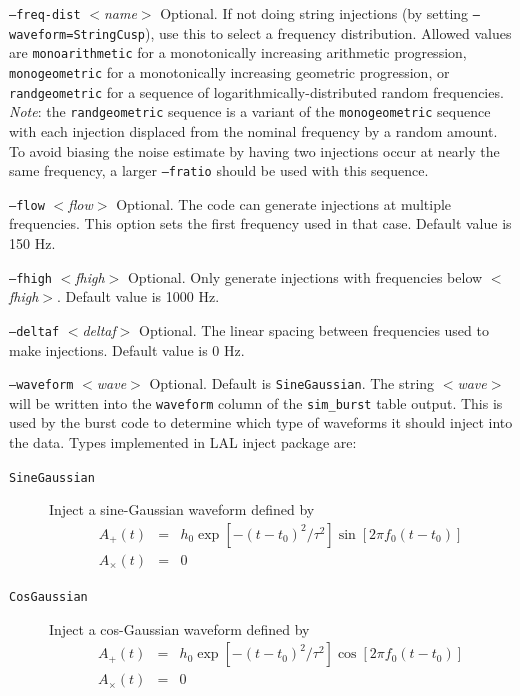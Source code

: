 \documentclass{article}
\newcommand{\option}[1]{\texttt{#1}}
\newcommand{\parm}[1]{$<$\textit{#1}$>$}
\newenvironment{entry}%
  {\begin{list}{}{\renewcommand{\makelabel}[1]%
    {\parbox[b]{\labelwidth}{\makebox[0pt][l]{\textbf{##1}}\\}}%
    \setlength{\labelwidth}{1em}%
    \setlength{\labelsep}{1em}%
    \setlength{\leftmargin}{2em}%
    \setlength{\topsep}{\medskipamount}%
    \setlength{\itemsep}{\medskipamount}%
    \setlength{\parsep}{\medskipamount}%
    \setlength{\listparindent}{0pt}}}
  {\end{list}}
\begin{document}
\begin{entry}
\begin{entry}
\item[\option{--freq-dist} \parm{name}]
Optional.  If not doing string injections (by setting
\option{--waveform=StringCusp}), use this to select a frequency
distribution.  Allowed values are \option{monoarithmetic} for a
monotonically increasing arithmetic progression, \option{monogeometric} for
a monotonically increasing geometric progression, or \option{randgeometric}
for a sequence of logarithmically-distributed random frequencies.
\emph{Note}:  the \option{randgeometric} sequence is a variant of the
\option{monogeometric} sequence with each injection displaced from the
nominal frequency by a random amount.  To avoid biasing the noise estimate
by having two injections occur at nearly the same frequency, a larger
\option{--fratio} should be used with this sequence.

\item[\option{--flow} \parm{flow}]
Optional.  The code can generate injections at multiple frequencies.  This
option sets the first frequency used in that case.  Default value is 150
Hz.

\item[\option{--fhigh} \parm{fhigh}]
Optional.  Only generate injections with frequencies below \parm{fhigh}.
Default value is 1000 Hz.

\item[\option{--deltaf} \parm{deltaf}]
Optional.  The linear spacing between frequencies used to make
injections.  Default value is 0 Hz.

\item[\option{--waveform} \parm{wave}]
Optional.  Default is \texttt{SineGaussian}.   The string \parm{wave} will
be written into the \texttt{waveform} column of the \texttt{sim\_burst}
table output. This is used by the burst code to determine which type of
waveforms it should inject into the data.  Types implemented in LAL inject
package are:
\begin{description}
\item[\texttt{SineGaussian}]  Inject a sine-Gaussian waveform defined by
\begin{eqnarray}
A_+(t) &=& h_0 \exp[ - (t-t_0)^2/ \tau^2 ] \sin[ 2 \pi f_0 (t-t_0)] \\
A_\times(t) &=& 0
\end{eqnarray}

\item[\texttt{CosGaussian}]  Inject a cos-Gaussian waveform defined by
\begin{eqnarray}
A_+(t) &=& h_0 \exp[ - (t-t_0)^2/ \tau^2 ] \cos[ 2 \pi f_0 (t-t_0)] \\
A_\times(t) &=& 0
\end{eqnarray}
\end{description}


\end{entry}
\end{entry}
\end{document}
